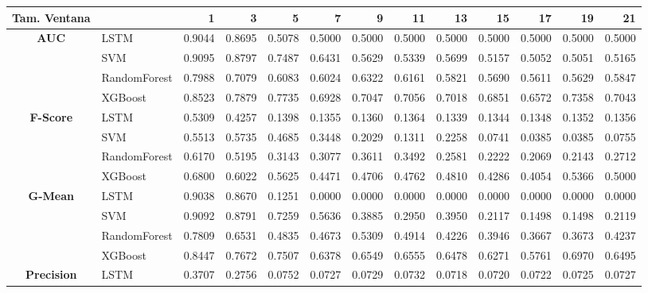 \newpage
\begin{table}[h]
\centering
\begin{adjustbox}{max width=15cm}
	\begin{tabular}{|c|l|r|r|r|r|r|r|r|r|r|r|r|}
		\hline
		\textbf{Tam. Ventana} &         &      1  &      3  &      5  &      7  &      9  &      11 &      13 &      15 &      17 &      19 &      21 \\
		\hline
		\textbf{AUC} & LSTM &  0.9044 &  0.8695 &  0.5078 &  0.5000 &  0.5000 &  0.5000 &  0.5000 &  0.5000 &  0.5000 &  0.5000 &  0.5000 \\
		& SVM &  0.9095 &  0.8797 &  0.7487 &  0.6431 &  0.5629 &  0.5339 &  0.5699 &  0.5157 &  0.5052 &  0.5051 &  0.5165 \\
		& RandomForest &  0.7988 &  0.7079 &  0.6083 &  0.6024 &  0.6322 &  0.6161 &  0.5821 &  0.5690 &  0.5611 &  0.5629 &  0.5847 \\
		& XGBoost &  0.8523 &  0.7879 &  0.7735 &  0.6928 &  0.7047 &  0.7056 &  0.7018 &  0.6851 &  0.6572 &  0.7358 &  0.7043 \\
		\hline
		\textbf{F-Score} & LSTM &  0.5309 &  0.4257 &  0.1398 &  0.1355 &  0.1360 &  0.1364 &  0.1339 &  0.1344 &  0.1348 &  0.1352 &  0.1356 \\
		& SVM &  0.5513 &  0.5735 &  0.4685 &  0.3448 &  0.2029 &  0.1311 &  0.2258 &  0.0741 &  0.0385 &  0.0385 &  0.0755 \\
		& RandomForest &  0.6170 &  0.5195 &  0.3143 &  0.3077 &  0.3611 &  0.3492 &  0.2581 &  0.2222 &  0.2069 &  0.2143 &  0.2712 \\
		& XGBoost &  0.6800 &  0.6022 &  0.5625 &  0.4471 &  0.4706 &  0.4762 &  0.4810 &  0.4286 &  0.4054 &  0.5366 &  0.5000 \\
		\hline
		\textbf{G-Mean} & LSTM &  0.9038 &  0.8670 &  0.1251 &  0.0000 &  0.0000 &  0.0000 &  0.0000 &  0.0000 &  0.0000 &  0.0000 &  0.0000 \\
		& SVM &  0.9092 &  0.8791 &  0.7259 &  0.5636 &  0.3885 &  0.2950 &  0.3950 &  0.2117 &  0.1498 &  0.1498 &  0.2119 \\
		& RandomForest &  0.7809 &  0.6531 &  0.4835 &  0.4673 &  0.5309 &  0.4914 &  0.4226 &  0.3946 &  0.3667 &  0.3673 &  0.4237 \\
		& XGBoost &  0.8447 &  0.7672 &  0.7507 &  0.6378 &  0.6549 &  0.6555 &  0.6478 &  0.6271 &  0.5761 &  0.6970 &  0.6495 \\
		\hline
		\textbf{Precision} & LSTM &  0.3707 &  0.2756 &  0.0752 &  0.0727 &  0.0729 &  0.0732 &  0.0718 &  0.0720 &  0.0722 &  0.0725 &  0.0727 \\

\end{tabular}
\end{adjustbox}
\end{table}
